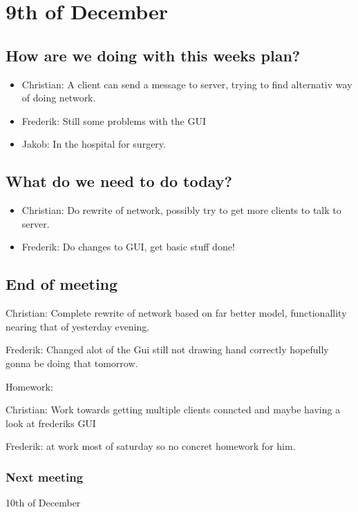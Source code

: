 \section{9th of December}
\subsection{How are we doing with this weeks plan?}
\begin{itemize}
\item Christian: A client can send a message to server, trying to find alternativ way of doing network.
\item Frederik: Still some problems with the GUI
\item Jakob: In the hospital for surgery.
\end{itemize}

\subsection{What do we need to do today?}
\begin{itemize}
\item Christian: Do rewrite of network, possibly try to get more clients to talk to server.
\item Frederik: Do changes to GUI, get basic stuff done!
\end{itemize}



\subsection{End of meeting}
Christian: Complete rewrite of network based on far better model, functionallity nearing that of yesterday evening.

Frederik: Changed alot of the Gui still not drawing hand correctly hopefully gonna be doing that tomorrow.

Homework:

Christian: Work towards getting multiple clients conncted and maybe having a look at frederiks GUI

Frederik: at work most of saturday so no concret homework for him.

\subsubsection{Next meeting}
10th of December
